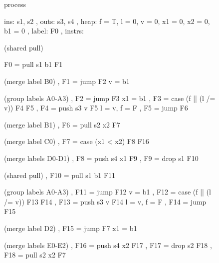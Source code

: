 \begin{figure}
\begin{code}
            process
            { ins:    { s1, s2 }
            , outs:   { s3, s4 }
            , heap:   { f = T, l = 0, v = 0, x1 = 0, x2 = 0, b1 = 0}
            , label:  F0
            , instrs:

  (shared pull)
              { F0  = pull s1 b1            F1  {}

  (merge label B0)
              , F1  = jump                  F2  {v  = b1}

  (group labels A0-A3)
              , F2  = jump                  F3  {x1 = b1}
              , F3  = case (f || (l /= v))  F4  {}                F5  {}
              , F4  = push s3 v             F5  {l  = v, f  = F}
              , F5  = jump                  F6  {}

  (merge label B1)
              , F6  = pull s2 x2            F7  {}

  (merge label C0)
              , F7  = case (x1 < x2)        F8  {}                F16 {}

  (merge labels D0-D1)
              , F8  = push s4 x1            F9  {}
              , F9  = drop s1               F10 {}

  (shared pull)
              , F10 = pull s1 b1            F11 {}

  (group labels A0-A3)
              , F11 = jump                  F12 {v  = b1}
              , F12 = case (f || (l /= v))  F13 {}                F14 {}
              , F13 = push s3 v             F14 {l  = v, f  = F}
              , F14 = jump                  F15 {}

  (merge label D2)
              , F15 = jump                  F7  {x1 = b1}

  (merge labels E0-E2)
              , F16 = push s4 x2            F17 {}
              , F17 = drop s2               F18 {}
              , F18 = pull s2 x2            F7  {} } }
\end{code}

%
%
%
%
%
%
%


\end{figure}
